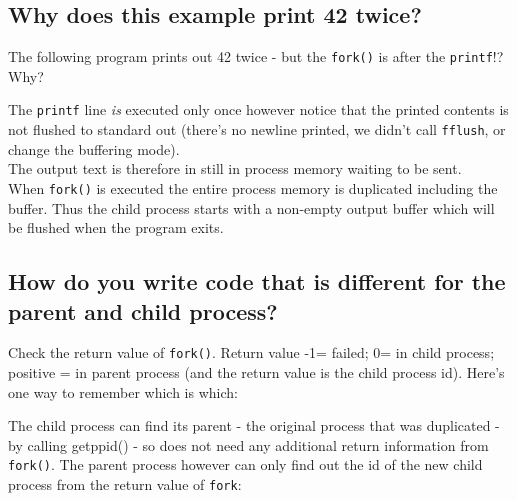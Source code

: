 \subsection{Why does this example print 42
twice?}\label{why-does-this-example-print-42-twice}

The following program prints out 42 twice - but the \texttt{fork()} is
after the \texttt{printf}!? Why?

\begin{Shaded}
\end{Shaded}

The \texttt{printf} line \emph{is} executed only once however notice
that the printed contents is not flushed to standard out (there's no
newline printed, we didn't call \texttt{fflush}, or change the buffering
mode).\\The output text is therefore in still in process memory waiting
to be sent.\\When \texttt{fork()} is executed the entire process memory
is duplicated including the buffer. Thus the child process starts with a
non-empty output buffer which will be flushed when the program exits.

\subsection{How do you write code that is different for the parent and
child
process?}\label{how-do-you-write-code-that-is-different-for-the-parent-and-child-process}

Check the return value of \texttt{fork()}. Return value -1= failed; 0=
in child process; positive = in parent process (and the return value is
the child process id). Here's one way to remember which is which:

The child process can find its parent - the original process that was
duplicated - by calling getppid() - so does not need any additional
return information from \texttt{fork()}. The parent process however can
only find out the id of the new child process from the return value of
\texttt{fork}:

